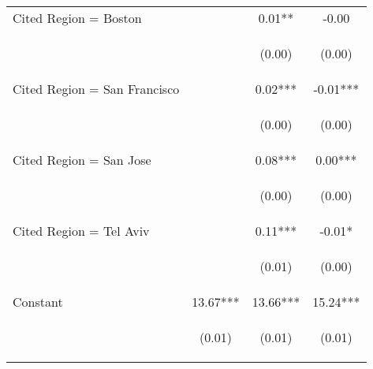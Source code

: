 \begin{center}
\begin{tabular}{lccc}
Cited Region = Boston &  & 0.01** & -0.00 \\
\vspace{4pt} & \begin{footnotesize}\end{footnotesize} & \begin{footnotesize}(0.00)\end{footnotesize} & \begin{footnotesize}(0.00)\end{footnotesize} \\
Cited Region = San Francisco &  & 0.02*** & -0.01*** \\
\vspace{4pt} & \begin{footnotesize}\end{footnotesize} & \begin{footnotesize}(0.00)\end{footnotesize} & \begin{footnotesize}(0.00)\end{footnotesize} \\
Cited Region = San Jose &  & 0.08*** & 0.00*** \\
\vspace{4pt} & \begin{footnotesize}\end{footnotesize} & \begin{footnotesize}(0.00)\end{footnotesize} & \begin{footnotesize}(0.00)\end{footnotesize} \\
Cited Region = Tel Aviv &  & 0.11*** & -0.01* \\
\vspace{4pt} & \begin{footnotesize}\end{footnotesize} & \begin{footnotesize}(0.01)\end{footnotesize} & \begin{footnotesize}(0.00)\end{footnotesize} \\
Constant & 13.67*** & 13.66*** & 15.24*** \\
 & \begin{footnotesize}(0.01)\end{footnotesize} & \begin{footnotesize}(0.01)\end{footnotesize} & \begin{footnotesize}(0.01)\end{footnotesize} \\

\end{tabular}
\end{center}

